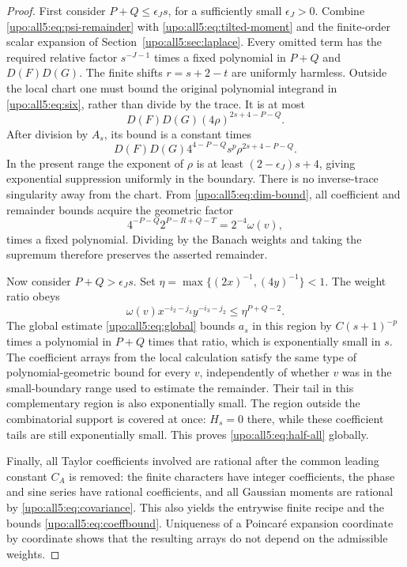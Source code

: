 \documentclass[11pt,letterpaper]{article}
\theoremstyle{remark}\newtheorem{remark}[theorem]{Remark}
\numberwithin{equation}{section}
\begin{document}
\begin{proof}
First consider $P+Q\le\epsilon_J s$, for a sufficiently small
$\epsilon_J>0$. Combine \eqref{upo:all5:eq:psi-remainder} with
\eqref{upo:all5:eq:tilted-moment} and the finite-order scalar expansion of
Section~\ref{upo:all5:sec:laplace}. Every omitted term has the required
relative factor $s^{-J-1}$ times a fixed polynomial in $P+Q$ and
$D(F)D(G)$. The finite shifts $r=s+2-t$ are uniformly harmless.
Outside the local chart one must bound the original polynomial
integrand in \eqref{upo:all5:eq:six}, rather than divide by the trace. It is
at most
\[
 D(F)D(G)(4\rho)^{2s+4-P-Q}.
\]
After division by $A_s$, its bound is a constant times
\[
 D(F)D(G)4^{4-P-Q}s^p\rho^{2s+4-P-Q}.
\]
In the present range the exponent of $\rho$ is at least
$(2-\epsilon_J)s+4$, giving exponential suppression uniformly in
the boundary. There is no inverse-trace singularity away from the
chart. From \eqref{upo:all5:eq:dim-bound}, all coefficient and remainder
bounds acquire the geometric factor
\begin{equation}\label{upo:all5:eq:geom}
 4^{-P-Q}2^{P-R+Q-T}=2^{-4}\omega(v),
\end{equation}
times a fixed polynomial. Dividing by the Banach weights and taking
the supremum therefore preserves the asserted remainder.

Now consider $P+Q>\epsilon_J s$. Set
$\eta=\max\{(2x)^{-1},(4y)^{-1}\}<1$. The weight ratio obeys
\[
 \omega(v)x^{-i_2-j_3}y^{-i_3-j_2}
                 \le\eta^{P+Q-2}.
\]
The global estimate \eqref{upo:all5:eq:global} bounds $a_s$ in this region
by $C(s+1)^{-p}$ times a polynomial in $P+Q$ times that ratio,
which is exponentially small in $s$. The coefficient arrays from
the local calculation satisfy the same type of polynomial-geometric
bound for every $v$, independently of whether $v$ was in the
small-boundary range used to estimate the remainder. Their tail
in this complementary region is also exponentially small. The
region outside the combinatorial support is covered at once:
$H_s=0$ there, while these coefficient tails are still exponentially
small. This proves \eqref{upo:all5:eq:half-all} globally.

Finally, all Taylor coefficients involved are rational after the
common leading constant $C_A$ is removed: the finite characters have
integer coefficients, the phase and sine series have rational
coefficients, and all Gaussian moments are rational by
\eqref{upo:all5:eq:covariance}. This also yields the entrywise finite recipe
and the bounds \eqref{upo:all5:eq:coeffbound}. Uniqueness of a Poincar\'e
expansion coordinate by coordinate shows that the resulting arrays
do not depend on the admissible weights.
\end{proof}
\end{document}

